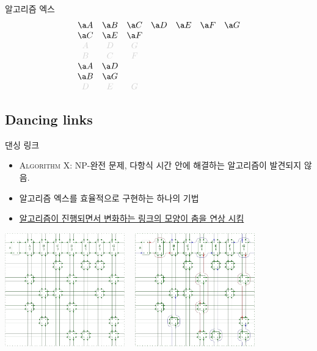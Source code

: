 \documentclass[xcolor=svgnames]{beamer}
\begin{document}
%
\begin{frame}{알고리즘 엑스}
\Large\boldmath
$$
  \begin{array}{ccccccc}
    \a A & \a B & \a C & \a D & \a E & \a F & \a G\\
    \a C & \a E & \a F &&&&\\
    \g A & \g D & \g G &&&&\\
    \g B & \g C & \g F &&&&\\
    \a A & \a D &&&&&\\
    \a B & \a G &&&&&\\
    \g D & \g E & \g G &&&&
  \end{array}
  $$
\end{frame}


\subsection{Dancing links}
%
\begin{frame}{댄싱 링크}
  \begin{itemize}
  \item \textsc{Algorithm X}: NP-완전 문제,
    다항식 시간 안에 해결하는 알고리즘이 발견되지 않음.
  \item 알고리즘 엑스를 효율적으로 구현하는 하나의 기법
  \item \href{https://www.youtube.com/watch?v=pN76VICZiKU&start=100}
    {알고리즘이 진행되면서 변화하는 링크의 모양이 춤을 연상 시킴}
  \end{itemize}
  \begin{center}
    \includegraphics[height=49mm]{imgs/cdance-2.png}
    ~
    \includegraphics[height=49mm]{imgs/cdance-4.png}
  \end{center}
\end{frame}
\end{document}
